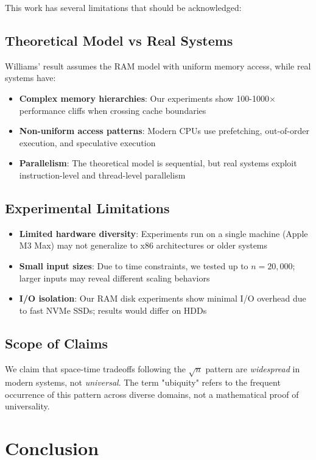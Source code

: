 \documentclass[11pt]{article}
\theoremstyle{definition}
\begin{document}
This work has several limitations that should be acknowledged:

\subsection{Theoretical Model vs Real Systems}

Williams' result assumes the RAM model with uniform memory access, while real systems have:
\begin{itemize}
\item \textbf{Complex memory hierarchies}: Our experiments show 100-1000× performance cliffs when crossing cache boundaries
\item \textbf{Non-uniform access patterns}: Modern CPUs use prefetching, out-of-order execution, and speculative execution
\item \textbf{Parallelism}: The theoretical model is sequential, but real systems exploit instruction-level and thread-level parallelism
\end{itemize}

\subsection{Experimental Limitations}

\begin{itemize}
\item \textbf{Limited hardware diversity}: Experiments run on a single machine (Apple M3 Max) may not generalize to x86 architectures or older systems
\item \textbf{Small input sizes}: Due to time constraints, we tested up to $n = 20,000$; larger inputs may reveal different scaling behaviors
\item \textbf{I/O isolation}: Our RAM disk experiments show minimal I/O overhead due to fast NVMe SSDs; results would differ on HDDs
\end{itemize}

\subsection{Scope of Claims}

We claim that space-time tradeoffs following the $\sqrt{n}$ pattern are \emph{widespread} in modern systems, not \emph{universal}. The term "ubiquity" refers to the frequent occurrence of this pattern across diverse domains, not a mathematical proof of universality.

\section{Conclusion}
\end{document}
